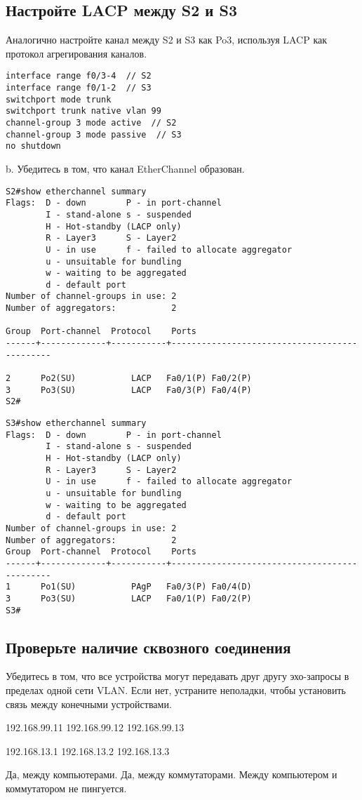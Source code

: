 \subsection{Настройте LACP между S2 и S3}

Аналогично настройте канал между S2 и S3 как Po3,
используя LACP как протокол агрегирования каналов.

\begin{verbatim}
interface range f0/3-4  // S2
interface range f0/1-2  // S3
switchport mode trunk
switchport trunk native vlan 99
channel-group 3 mode active  // S2
channel-group 3 mode passive  // S3
no shutdown
\end{verbatim}

b. Убедитесь в том, что канал EtherChannel образован.

\begin{verbatim}
S2#show etherchannel summary
Flags:  D - down        P - in port-channel
        I - stand-alone s - suspended
        H - Hot-standby (LACP only)
        R - Layer3      S - Layer2
        U - in use      f - failed to allocate aggregator
        u - unsuitable for bundling
        w - waiting to be aggregated
        d - default port
Number of channel-groups in use: 2
Number of aggregators:           2

Group  Port-channel  Protocol    Ports
------+-------------+-----------+----------------------------------------------

2      Po2(SU)           LACP   Fa0/1(P) Fa0/2(P) 
3      Po3(SU)           LACP   Fa0/3(P) Fa0/4(P) 
S2#
\end{verbatim}

\begin{verbatim}
S3#show etherchannel summary
Flags:  D - down        P - in port-channel
        I - stand-alone s - suspended
        H - Hot-standby (LACP only)
        R - Layer3      S - Layer2
        U - in use      f - failed to allocate aggregator
        u - unsuitable for bundling
        w - waiting to be aggregated
        d - default port
Number of channel-groups in use: 2
Number of aggregators:           2
Group  Port-channel  Protocol    Ports
------+-------------+-----------+----------------------------------------------
1      Po1(SU)           PAgP   Fa0/3(P) Fa0/4(D) 
3      Po3(SU)           LACP   Fa0/1(P) Fa0/2(P) 
S3#
\end{verbatim}

\subsection{Проверьте наличие сквозного соединения}

Убедитесь в том, что все устройства могут передавать друг другу эхо-запросы
в пределах одной сети VLAN.
Если нет, устраните неполадки,
чтобы установить связь между конечными устройствами.

192.168.99.11
192.168.99.12
192.168.99.13

192.168.13.1
192.168.13.2
192.168.13.3

Да, между компьютерами. Да, между коммутаторами.
Между компьютером и коммутатором не пингуется.

